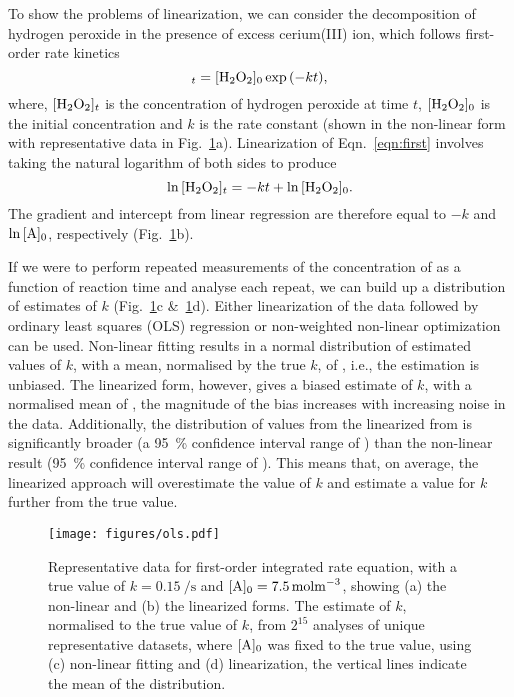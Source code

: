 \documentclass[journal=jceda8,manuscript=article]{achemso}
\begin{document}
To show the problems of linearization, we can consider the decomposition of hydrogen peroxide  in the presence of excess cerium(III) ion, which follows first-order rate kinetics~\cite{monk_math_2010}
%
\begin{equation}
    [\ce{H2O2}]_t = [\ce{H2O2}]_0\exp{(-kt)},
    \label{eqn:first}
\end{equation}
%
where, $[\ce{H2O2}]_t$ is the concentration of hydrogen peroxide at time $t$, $[\ce{H2O2}]_0$ is the initial concentration and $k$ is the rate constant (shown in the non-linear form with representative data in Fig.~\ref{fig:ols}a).
Linearization of Eqn.~\ref{eqn:first} involves taking the natural logarithm of both sides to produce
%
\begin{equation}
    \ln{[\ce{H2O2}]_t} = -kt + \ln{[\ce{H2O2}]_0}.
    \label{eqn:log}
\end{equation}
%
The gradient and intercept from linear regression are therefore equal to $-k$ and $\ln{[\ce{A}]_0}$, respectively (Fig.~\ref{fig:ols}b).

If we were to perform repeated measurements of the concentration of  as a function of reaction time and analyse each repeat, we can build up a distribution of estimates of $k$ (Fig.~\ref{fig:ols}c \&~\ref{fig:ols}d). 
Either linearization of the data followed by ordinary least squares (OLS) regression or non-weighted non-linear optimization can be used. 
Non-linear fitting results in a normal distribution of estimated values of $k$, with a mean, normalised by the true $k$, of , i.e., the estimation is unbiased. 
The linearized form, however, gives a biased estimate of $k$, with a normalised mean of , the magnitude of the bias increases with increasing noise in the data.
Additionally, the distribution of values from the linearized from is significantly broader (a \SI{95}{\percent} confidence interval range of ) than the non-linear result (\SI{95}{\percent} confidence interval range of ).
This means that, on average, the linearized approach will overestimate the value of $k$ and estimate a value for $k$ further from the true value. 
%
\begin{figure}
  \texttt{[image: figures/ols.pdf]}
  \caption{
    Representative data for first-order integrated rate equation, with a true value of $k=\SI{0.15}{\per\second}$ and $[\ce{A}]_0=\SI{7.5}{\mol\m^{-3}}$, showing (a) the non-linear and (b) the linearized forms. 
    The estimate of $k$, normalised to the true value of $k$, from $2^{15}$ analyses of unique representative datasets, where $[\ce{A}]_0$ was fixed to the true value, using (c) non-linear fitting and (d) linearization, the vertical lines indicate the mean of the distribution. 
    }
  \label{fig:ols}
\end{figure}
%
\end{document}
